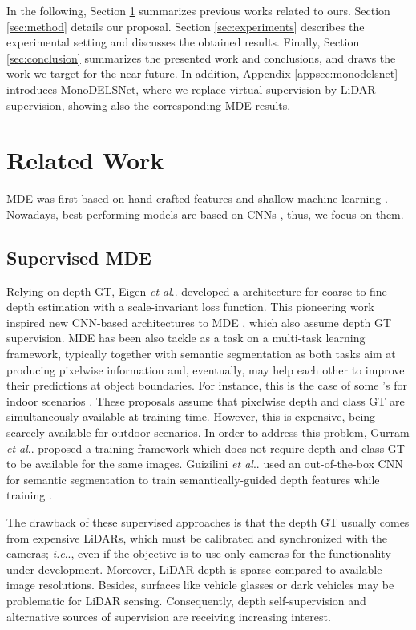 \documentclass[journal]{IEEEtran}
\makeatletter
\DeclareRobustCommand\onedot{\futurelet\@let@token\@onedot}
\def\@onedot{\ifx\@let@token.\else.\null\fi\xspace}
\def\ie{\emph{i.e}\onedot} \def\Ie{\emph{I.e}\onedot}
\def\etal{\emph{et al}\onedot}
\makeatother
\begin{document}
In the following, Section \ref{sec:relatedwork} summarizes previous works related to ours. Section \ref{sec:method} details our proposal. Section \ref{sec:experiments} describes the experimental setting and discusses the obtained results. Finally, Section \ref{sec:conclusion} summarizes the presented work and conclusions, and draws the work we target for the near future. In addition, Appendix \ref{appsec:monodelsnet} introduces MonoDELSNet, where we replace virtual supervision by LiDAR supervision, showing also the corresponding MDE results.

\section{Related Work}
\label{sec:relatedwork}
MDE was first based on hand-crafted features and shallow machine learning \cite{Saxena:2007, Liu:2010, Ladicky:2014, Srikakulapu:2015}. Nowadays, best performing models are based on CNNs \cite{De:2021}, thus, we focus on them. 

\subsection{Supervised MDE}
\label{sec:rw:supervised}

Relying on depth GT, Eigen {\etal} \cite{Eigen:2014} developed a  architecture for coarse-to-fine depth estimation with a scale-invariant loss function. This pioneering work inspired new CNN-based architectures to MDE \cite{Liu:2016, Laina:2016, Roy:2016, Cao:2017, He:2018, Xu:2018, Fu:2018DORN}, which also assume depth GT supervision. MDE has been also tackle as a task on a multi-task learning framework, typically together with semantic segmentation as both tasks aim at producing pixelwise information and, eventually, may help each other to improve their predictions at object boundaries. For instance, this is the case of some {'s} for indoor scenarios \cite{Mousavian:2016, Jafari:2017, Jiao:2018}. These proposals assume that pixelwise depth and class GT are simultaneously available at training time. However, this is expensive, being scarcely available for outdoor scenarios. In order to address this problem, Gurram {\etal} \cite{Gurram:2018} proposed a training framework which does not require depth and class GT to be available for the same images. Guizilini {\etal} \cite{Guizilini:2020semantic} used an out-of-the-box CNN for semantic segmentation to train semantically-guided depth features while training . 

The drawback of these supervised approaches is that the depth GT usually comes from expensive LiDARs, which must be calibrated and synchronized with the cameras; {\ie}, even if the objective is to use only cameras for the functionality under development. Moreover, LiDAR depth is sparse compared to available image resolutions. Besides, surfaces like vehicle glasses or dark vehicles may be problematic for LiDAR sensing. Consequently, depth self-supervision and alternative sources of supervision are receiving increasing interest. 
\end{document}
